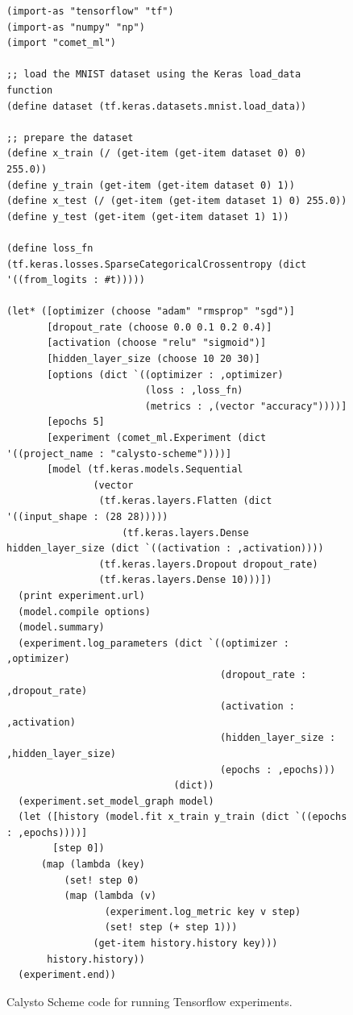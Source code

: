 \documentclass[acmsmall,screen,authorversion]{acmart}
\begin{document}
\begin{figure}
\begin{minipage}{0.8\textwidth}
{\scriptsize
\begin{verbatim}
(import-as "tensorflow" "tf")
(import-as "numpy" "np")
(import "comet_ml")

;; load the MNIST dataset using the Keras load_data function
(define dataset (tf.keras.datasets.mnist.load_data))

;; prepare the dataset
(define x_train (/ (get-item (get-item dataset 0) 0) 255.0))
(define y_train (get-item (get-item dataset 0) 1))
(define x_test (/ (get-item (get-item dataset 1) 0) 255.0))
(define y_test (get-item (get-item dataset 1) 1))

(define loss_fn (tf.keras.losses.SparseCategoricalCrossentropy (dict '((from_logits : #t)))))

(let* ([optimizer (choose "adam" "rmsprop" "sgd")]
       [dropout_rate (choose 0.0 0.1 0.2 0.4)]
       [activation (choose "relu" "sigmoid")]
       [hidden_layer_size (choose 10 20 30)]
       [options (dict `((optimizer : ,optimizer)
                        (loss : ,loss_fn)
                        (metrics : ,(vector "accuracy"))))]
       [epochs 5]
       [experiment (comet_ml.Experiment (dict '((project_name : "calysto-scheme"))))]
       [model (tf.keras.models.Sequential
               (vector
                (tf.keras.layers.Flatten (dict '((input_shape : (28 28)))))
                    (tf.keras.layers.Dense hidden_layer_size (dict `((activation : ,activation))))
                (tf.keras.layers.Dropout dropout_rate)
                (tf.keras.layers.Dense 10)))])
  (print experiment.url)
  (model.compile options)
  (model.summary)
  (experiment.log_parameters (dict `((optimizer : ,optimizer)
                                     (dropout_rate : ,dropout_rate)
                                     (activation : ,activation)
                                     (hidden_layer_size : ,hidden_layer_size)
                                     (epochs : ,epochs)))
                             (dict))
  (experiment.set_model_graph model)
  (let ([history (model.fit x_train y_train (dict `((epochs : ,epochs))))]
        [step 0])
      (map (lambda (key)
          (set! step 0)
          (map (lambda (v)
                 (experiment.log_metric key v step)
                 (set! step (+ step 1)))
               (get-item history.history key)))
       history.history))
  (experiment.end))
\end{verbatim}
}
\end{minipage}
\caption{Calysto Scheme code for running Tensorflow experiments.}
\label{fig:tensorflow}
\end{figure}
\end{document}
